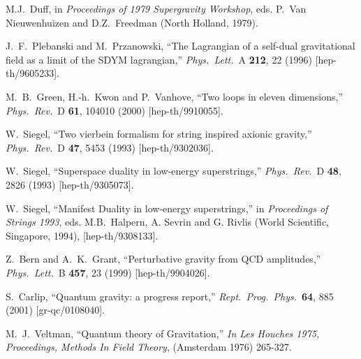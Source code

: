 \begin{thebibliography}{99}
M.J.\ Duff, in {\it Proceedings of 1979 Supergravity Workshop},
eds. P.\ Van Nieuwenhuizen and D.Z.\ Freedman (North Holland, 1979).

J.~F.~Plebanski and M.~Przanowski,
``The Lagrangian of a self-dual gravitational field as a limit 
of the  SDYM lagrangian,''
{\it Phys.\ Lett.}\ A {\bf 212}, 22 (1996)
[hep-th/9605233].

M.~B.~Green, H.-h.~Kwon and P.~Vanhove,
``Two loops in eleven dimensions,''
{\it Phys.\ Rev.}\ D {\bf 61}, 104010 (2000)
[hep-th/9910055].

W.~Siegel,
``Two vierbein formalism for string inspired axionic gravity,''
{\it Phys.\ Rev.}\ D {\bf 47}, 5453 (1993)
[hep-th/9302036].

W.~Siegel,
``Superspace duality in low-energy superstrings,''
{\it Phys.\ Rev.}\ D {\bf 48}, 2826 (1993)
[hep-th/9305073].

W.~Siegel, 
``Manifest Duality in low-energy superstrings,''
in {\it Proceedings of Strings 1993}, 
eds. M.B.\ Halpern, A. Sevrin and G. Rivlis
(World Scientific, Singapore, 1994), [hep-th/9308133].

Z.~Bern and A.~K.~Grant,
``Perturbative gravity from {QCD} amplitudes,''
{\it Phys.\ Lett.}\ B {\bf 457}, 23 (1999)
[hep-th/9904026].

S.~Carlip,
``Quantum gravity: a progress report,''
{\it Rept.\ Prog.\ Phys.}\ {\bf 64}, 885 (2001)
[gr-qc/0108040].

M.~J.~Veltman,
``Quantum theory of Gravitation,''
{\it  In Les Houches 1975, Proceedings, Methods In Field Theory}, 
(Amsterdam 1976) 265-327.


\end{thebibliography}
